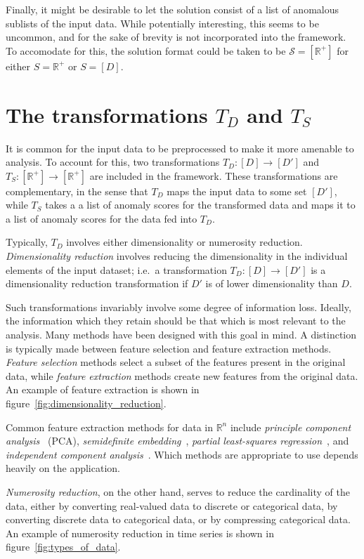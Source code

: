 Finally, it might be desirable to let the solution consist of a list of anomalous sublists of the input data. While potentially interesting, this seems to be uncommon, and for the sake of brevity is not incorporated into the framework. To accomodate for this, the solution format could be taken to be $\mathcal{S} = [\mathbb{R}^+]$ for either $S = \mathbb{R}^+$ or $S = [D]$.

\section{The transformations $T_D$ and $T_S$}

It is common for the input data to be preprocessed to make it more amenable to analysis. To account for this, two transformations $T_D: [D] \rightarrow [D']$ and $T_S: [\mathbb{R}^+] \rightarrow [\mathbb{R}^+]$ are included in the framework. These transformations are complementary, in the sense that $T_D$ maps the input data to some set $[D']$, while $T_S$ takes a a list of anomaly scores for the transformed data and maps it to a list of anomaly scores for the data fed into $T_D$.

Typically, $T_D$ involves either dimensionality or numerosity reduction. \emph{Dimensionality reduction} involves reducing the dimensionality in the individual elements of the input dataset; i.e.\ a transformation $T_D: [D] \rightarrow [D']$ is a dimensionality reduction transformation if $D'$ is of lower dimensionality than $D$.

Such transformations invariably involve some degree of information loss. Ideally, the information which they retain should be that which is most relevant to the analysis. Many methods have been designed with this goal in mind. A distinction is typically made between feature selection and feature extraction methods. \emph{Feature selection} methods select a subset of the features present in the original data, while \emph{feature extraction} methods create new features from the original data. An example of feature extraction is shown in figure~\ref{fig:dimensionality_reduction}.

Common feature extraction methods for data in $\mathbb{R}^n$ include \emph{principle component analysis}~\cite{TODO} (PCA), \emph{semidefinite embedding}~\cite{TODO}, \emph{partial least-squares regression}~\cite{TODO}, and \emph{independent component analysis}~\cite{TODO}. Which methods are appropriate to use depends heavily on the application.

\emph{Numerosity reduction}, on the other hand, serves to reduce the cardinality of the data, either by converting real-valued data to discrete or categorical data, by converting discrete data to categorical data, or by compressing categorical data. An example of numerosity reduction in time series is shown in figure~\ref{fig:types_of_data}.

